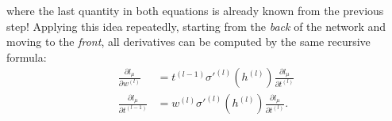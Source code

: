\documentclass{article}
\begin{document}
where the last quantity in both equations is already known from the previous step! Applying this idea repeatedly, starting from the \emph{back} of the network and moving to the \emph{front}, all derivatives can be computed by the same recursive formula:
\begin{align}
    \frac{\partial l_{\mu}}{\partial w^{(l)}}
    &=
    t^{(l-1)}\sigma'^{(l)}(h^{(l)})
    \frac{\partial l_{\mu}}{\partial t^{(l)}} \\
    \frac{\partial l_{\mu}}{\partial t^{(l-1)}}
    &=
    w^{(l)}\sigma'^{(l)}(h^{(l)})
    \frac{\partial l_{\mu}}{\partial t^{(l)}}.
\end{align}
\end{document}
